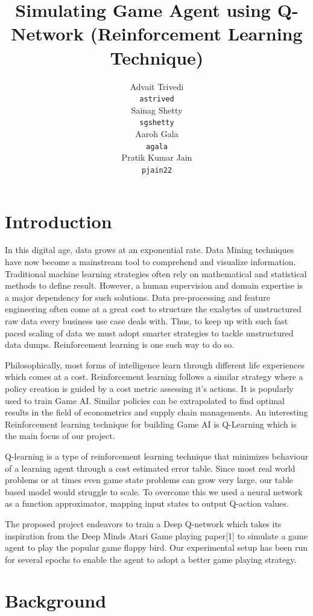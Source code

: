 \documentclass{article}
\title{Simulating Game Agent using Q-Network
(Reinforcement Learning Technique)}
\author{
  Advait Trivedi \\
  \texttt{astrived} \\
  \AND
  Sainag Shetty \\
  \texttt{sgshetty} \\
   \And
  Aaroh Gala \\
  \texttt{agala} \\
  \And
  Pratik Kumar Jain \\
  \texttt{pjain22} \\
}
\begin{document}

\maketitle
\section{Introduction}

In this digital age, data grows at an exponential rate.  Data Mining techniques have now become  a mainstream tool to comprehend and visualize information. Traditional machine learning strategies often rely on mathematical and statistical methods to define result. However, a human supervision and domain expertise is a major dependency for such solutions. Data pre-processing and feature engineering often come at a great cost to structure the exabytes of unstructured raw data every business use case deals with. Thus, to keep up with such fast paced scaling of data we must adopt smarter strategies to tackle unstructured data dumps. Reinforcement learning is one such way to do so.

Philosophically, most forms of intelligence learn through different life experiences which comes at a cost. Reinforcement learning follows a similar strategy where a policy creation is guided by a cost metric assessing it’s actions. It is popularly used to train Game AI. Similar policies can be extrapolated to find optimal results in the field of econometrics and supply chain managements. An interesting Reinforcement learning technique for building Game AI is Q-Learning which is the main focus of our project.

Q-learning is a type of reinforcement learning technique that minimizes behaviour of a learning agent through a cost estimated error table. Since most real world problems or at times even game state problems can grow very large, our table based model would struggle to scale. To overcome this we used a neural network as a function approximator, mapping input states to output Q-action values.

The proposed project endeavors to train a Deep Q-network which takes its inspiration from the Deep Minds Atari Game playing paper[1] to simulate a game agent to play the popular game flappy bird. Our experimental setup has been run for several epochs to enable the agent to adopt a better game playing strategy.


\section{Background}
\end{document}
